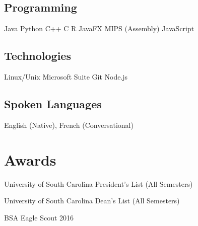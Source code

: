 \documentclass[letterpaper]{deedy-resume}
\begin{document}
\begin{minipage}[t]{0.29\textwidth}
\subsection{Programming}
Java \textbullet{} Python \textbullet{} C++ \textbullet{} C \textbullet{} R \textbullet{} JavaFX  MIPS (Assembly) \textbullet{} JavaScript
\sectionspace

\subsection{Technologies}
Linux/Unix \textbullet{} Microsoft Suite \textbullet{} Git Node.js 
\sectionspace 

\subsection{Spoken Languages}
English (Native), French (Conversational)


\sectionspace

\section{Awards}
\vspace{0.2cm}
\setlength{\leftmargini}{1em}
\begin{tightitemize}
\item University of South Carolina President's List (All Semesters)
\item University of South Carolina Dean's List (All Semesters)
\item BSA Eagle Scout 2016
\end{tightitemize}


\sectionspace


\sectionspace 

\end{minipage} 
\hfill
%
%
\end{document}
